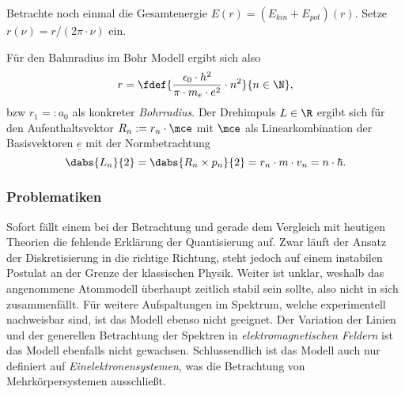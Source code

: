 \documentclass{subfiles}
\begin{document}
        \begin{Aufgabe}
            \nr{} Betrachte noch einmal die Gesamtenergie $E(r) = (E_\textit{kin} + E_\textit{pot})(r)$. Setze $r(\nu) = r/(2\pi\cdot\nu)$ ein.
        \end{Aufgabe}

        Für den Bahnradius im Bohr Modell ergibt sich also
        \[r = \fdef{\frac{\epsilon_0\cdot h^2}{\pi\cdot m_e\cdot e^2}\cdot n^2}{n\in\N},\]
        bzw $r_1 =: a_0$ als konkreter \emph{Bohrradius}. Der Drehimpuls $L\in\R$ ergibt sich für den Aufenthaltsvektor $R_n:=r_n\cdot \mce$ mit $\mce$ als Linearkombination der Basisvektoren $\underline e$ mit der Normbetrachtung
        \[\dabs{L_n}{2} = \dabs{R_n\times p_n}{2} = r_n\cdot m\cdot v_n = n\cdot\hbar.\]


        \subsubsection*{Problematiken}
            Sofort fällt einem bei der Betrachtung und gerade dem Vergleich mit heutigen Theorien die fehlende Erklärung der Quantisierung auf. Zwar läuft der Ansatz der Diskretisierung in die richtige Richtung, steht jedoch auf einem instabilen Postulat an der Grenze der klassischen Physik. Weiter ist unklar, weshalb das angenommene Atommodell überhaupt zeitlich stabil sein sollte, also nicht in sich zusammenfällt. Für weitere Aufspaltungen im Spektrum, welche experimentell nachweisbar sind, ist das Modell ebenso nicht geeignet. Der Variation der Linien und der generellen Betrachtung der Spektren in \emph{elektromagnetischen Feldern} ist das Modell ebenfalls nicht gewachsen. Schlussendlich ist das Modell auch nur definiert auf \emph{Einelektronensystemen}, was die Betrachtung von Mehrkörpersystemen ausschließt.
\end{document}
